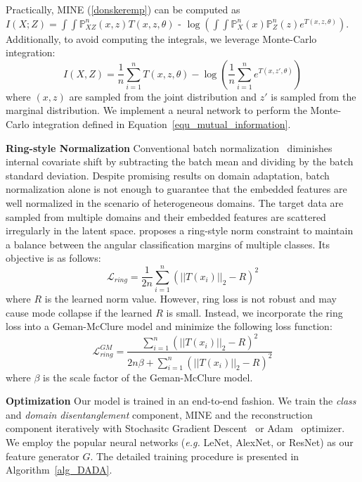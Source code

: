 \documentclass{article}
\begin{document}
 
Practically, MINE (\ref{donskeremp}) can be computed as $I(X;Z)=\int\int{\mathbb{P}^{n}_{XZ}(x,z)T(x,z,\theta)}$ - $\log (\int\int\mathbb{P}^{n}_{X}(x)\mathbb{P}^n_{Z}(z)e^{T(x,z,\theta)})$. Additionally, to avoid computing the integrals, we leverage Monte-Carlo integration:
\begin{equation}
I(X,Z)=\frac{1}{n}\sum^{n}_{i=1}T(x,z,\theta)-\log(\frac{1}{n}\sum_{i=1}^{n}e^{T(x,z',\theta)})
\label{equ_mutual_information}
\end{equation}
 where $(x,z)$ are sampled from the joint distribution and $z'$ is sampled from the marginal distribution. We implement a neural network to perform the Monte-Carlo integration defined in Equation~\ref{equ_mutual_information}.





\textbf{Ring-style Normalization} Conventional batch normalization~\cite{batch_normalization} diminishes internal covariate shift by subtracting the batch mean and dividing by the batch standard deviation. Despite promising results on domain adaptation, batch normalization alone is not enough to guarantee that the embedded features are well normalized in the scenario of heterogeneous domains. The target data are sampled from multiple domains and their embedded features are scattered irregularly in the latent space. \citet{ringloss} proposes a ring-style norm constraint to maintain a balance between the angular classification margins of multiple classes. Its objective is as follows:
\begin{equation}
    \mathcal{L}_{ring} =  \frac{1}{2n}\sum_{i=1}^{n}(||T(x_i)||_2-R)^2
\end{equation}
where $R$ is the learned norm value. However, ring loss is not robust and may cause mode collapse if the learned $R$ is small. Instead, we incorporate the ring loss into a Geman-McClure model and minimize the following loss function:
\begin{equation}
    \mathcal{L}_{ring}^{GM} =  \frac{\sum_{i=1}^{n}(||T(x_i)||_2-R)^2}{2n\beta +\sum_{i=1}^{n}(||T(x_i)||_2-R)^2 }
    \label{equ_ring_loss}
\end{equation}
where $\beta$ is the scale factor of the Geman-McClure model. 

\textbf{Optimization} Our model is trained in an end-to-end fashion. We train the \textit{class} and \textit{domain disentanglement} component, MINE and the reconstruction component iteratively with Stochasitc Gradient Descent~\cite{SGD} or Adam~\cite{Adam} optimizer. We employ the popular neural networks (\textit{e.g.} LeNet, AlexNet, or ResNet) as our feature generator $G$. The detailed training procedure is presented in Algorithm~\ref{alg_DADA}.
\end{document}
